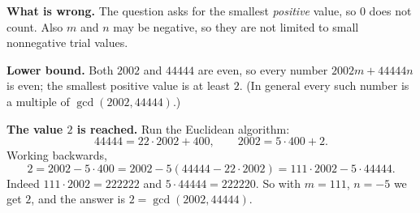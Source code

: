 \textbf{What is wrong.} The question asks for the smallest \emph{positive} value, so $0$ does not count. Also $m$ and $n$ may be negative, so they are not limited to small nonnegative trial values.

\textbf{Lower bound.} Both $2002$ and $44444$ are even, so every number $2002m+44444n$ is even; the smallest positive value is at least $2$. (In general every such number is a multiple of $\gcd(2002,44444)$.)

\textbf{The value $2$ is reached.} Run the Euclidean algorithm:
\[
44444=22\cdot2002+400,\qquad 2002=5\cdot400+2 .
\]
Working backwards,
\[
2=2002-5\cdot400=2002-5(44444-22\cdot2002)=111\cdot2002-5\cdot44444 .
\]
Indeed $111\cdot2002=222222$ and $5\cdot44444=222220$. So with $m=111$, $n=-5$ we get $2$, and the answer is $\boxed{2}=\gcd(2002,44444)$.
